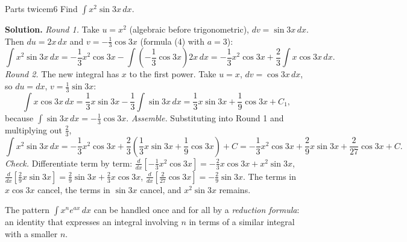 \documentclass[11pt]{article}
\begin{document}
\begin{exmp}{Parts twice}{m6}
Find $\int x^2\sin3x\,dx$.

\textbf{Solution.} \emph{Round 1.} Take $u=x^2$ (algebraic before trigonometric), $dv=\sin3x\,dx$. Then $du=2x\,dx$ and $v=-\frac13\cos3x$ (formula (4) with $a=3$):
\[\int x^2\sin3x\,dx=-\frac13x^2\cos3x-\int\left(-\frac13\cos3x\right)2x\,dx=-\frac13x^2\cos3x+\frac23\int x\cos3x\,dx .\]
\emph{Round 2.} The new integral has $x$ to the first power. Take $u=x$, $dv=\cos3x\,dx$, so $du=dx$, $v=\frac13\sin3x$:
\[\int x\cos3x\,dx=\frac13x\sin3x-\frac13\int\sin3x\,dx=\frac13x\sin3x+\frac19\cos3x+C_1,\]
because $\int\sin3x\,dx=-\frac13\cos3x$. \emph{Assemble.} Substituting into Round 1 and multiplying out $\frac23$,
\[\int x^2\sin3x\,dx=-\frac13x^2\cos3x+\frac23\left(\frac13x\sin3x+\frac19\cos3x\right)+C=-\frac13x^2\cos3x+\frac29x\sin3x+\frac2{27}\cos3x+C .\]
\emph{Check.} Differentiate term by term: $\frac{d}{dx}\left[-\frac13x^2\cos3x\right]=-\frac23x\cos3x+x^2\sin3x$, $\frac{d}{dx}\left[\frac29x\sin3x\right]=\frac29\sin3x+\frac23x\cos3x$, $\frac{d}{dx}\left[\frac2{27}\cos3x\right]=-\frac29\sin3x$. The terms in $x\cos3x$ cancel, the terms in $\sin3x$ cancel, and $x^2\sin3x$ remains.
\end{exmp}

The pattern $\int x^ne^{ax}\,dx$ can be handled once and for all by a \emph{reduction formula}: an identity that expresses an integral involving $n$ in terms of a similar integral with a smaller $n$.
\end{document}
